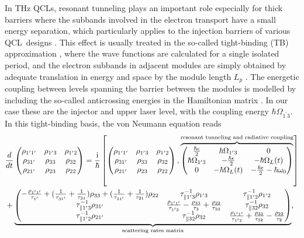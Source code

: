 \documentclass[10pt,letterpaper]{article}%
\begin{document}
In THz QCLs, resonant tunneling plays an important role especially for thick
barriers where the subbands involved in the electron transport have a small
energy separation, which particularly applies to the injection barriers of
various QCL\ designs
\cite{callebaut2005importance,kumar2009coherence,dupont2010simplified}. This
effect is usually treated in the so-called tight-binding (TB) approximation
\cite{bastardwave}, where the wave functions are calculated for a single
isolated period, and the electron subbands in adjacent modules are simply
obtained by adequate translation in energy and space by the module length
$L_{p}$ \cite{callebaut2005importance}. The energetic coupling between levels
spanning the barrier between the modules is modelled by including the
so-called anticrossing energies in the Hamiltonian matrix
\cite{kumar2009coherence,dupont2010simplified}. In our case these are the
injector and upper laser level, with the coupling energy $\hbar\Omega
_{1^{\prime}3}$. In this tight-binding basis, the von Neumann equation reads
\begin{align}
&  \frac{d}{dt}%
\begin{pmatrix}
\rho_{1^{\prime}1^{\prime}} & \rho_{1^{\prime}3} & \rho_{1^{\prime}2}\\
\rho_{31^{\prime}} & \rho_{33} & \rho_{32}\\
\rho_{21^{\prime}} & \rho_{23} & \rho_{22}%
\end{pmatrix}
=\frac{\mathrm{i}}{\hbar}\left[
\begin{pmatrix}
\rho_{1^{\prime}1^{\prime}} & \rho_{1^{\prime}3} & \rho_{1^{\prime}2}\\
\rho_{31^{\prime}} & \rho_{33} & \rho_{32}\\
\rho_{21^{\prime}} & \rho_{23} & \rho_{22}%
\end{pmatrix}
,\overbrace{%
\begin{pmatrix}
\frac{\hbar\epsilon}{2} & \hbar\Omega_{1^{\prime}3} & 0\\
\hbar\Omega_{1^{\prime}3} & -\frac{\hbar\epsilon}{2} & -\hbar\Omega_{L}(t)\\
0 & -\hbar\Omega_{L}(t) & -\frac{\hbar\epsilon}{2}-\hbar\omega_{0}%
\end{pmatrix}
}^{\text{resonant tunneling and radiative coupling}}\right] \nonumber\\
&  +\underbrace{%
\begin{pmatrix}
-\frac{\rho_{1^{\prime}1^{\prime}}}{\tau_{1^{\prime}}}+(\frac{1}%
{\tau_{31^{\prime}}}+\frac{1}{\tau_{31}})\rho_{33}+(\frac{1}{\tau_{21^{\prime
}}}+\frac{1}{\tau_{21}})\rho_{22} & \tau_{\parallel1^{\prime}3}^{-1}%
\rho_{1^{\prime}3} & \tau_{\parallel1^{\prime}2}^{-1}\rho_{1^{\prime}2}\\
\tau_{\parallel1^{\prime}3}^{-1}\rho_{31^{\prime}} & \frac{\rho_{1^{\prime
}1^{\prime}}}{\tau_{1^{\prime}3}}-\frac{\rho_{33}}{\tau_{3}}+\frac{\rho_{22}%
}{\tau_{23}} & \tau_{\parallel32}^{-1}\rho_{32}\\
\tau_{\parallel1^{\prime}2}^{-1}\rho_{21^{\prime}} & \tau_{\parallel32}%
^{-1}\rho_{32} & \frac{\rho_{1^{\prime}1^{\prime}}}{\tau_{1^{\prime}2}}%
+\frac{\rho_{33}}{\tau_{32}}-\frac{\rho_{22}}{\tau_{2}}%
\end{pmatrix}
}_{\text{scattering rates matrix}}, \label{eq:vonNeumannmatrix}%
\end{align}
\end{document}
